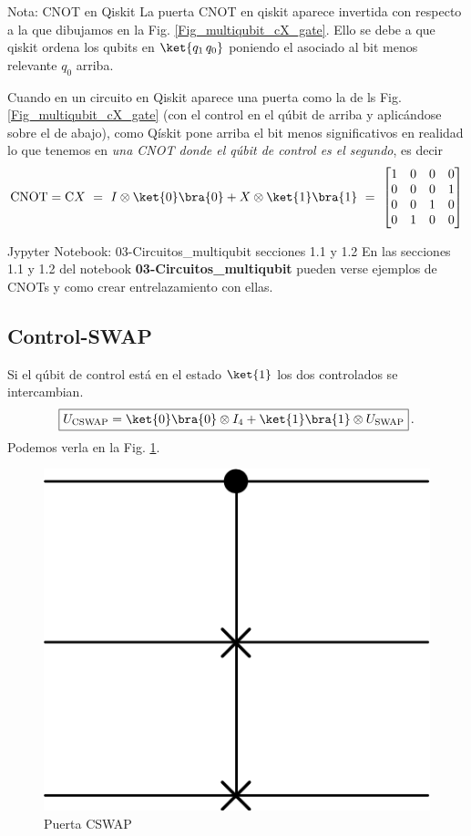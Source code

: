 \documentclass[a4paper,11pt]{book} %
\numberwithin{equation}{chapter}
\newcommand{\cg}[1]{{\rm C}#1}
\begin{document}
	\begin{mybox_blue}{Nota: CNOT en Qiskit}
	La puerta CNOT en qiskit aparece invertida con respecto a la que dibujamos en la Fig. \ref{Fig_multiqubit_cX_gate}. Ello se debe a que qiskit ordena 
	los qubits en $\ket{q_1 \, q_0}$ poniendo el asociado al bit menos relevante $q_0$ arriba. 
	
	\vspace{0.3cm}
	Cuando en un circuito en Qiskit aparece una puerta como la de ls Fig. \ref{Fig_multiqubit_cX_gate} (con el control en el qúbit de arriba y aplicándose sobre el de abajo), como Qískit pone arriba el 
	bit menos significativos en realidad lo que tenemos en \textit{una CNOT donde el qúbit de control es el segundo}, es decir
		\begin{equation}
		\hbox{CNOT} = \cg{X} ~=~ I \otimes \ket{0}\bra{0} + X \otimes \ket{1}\bra{1} 
		~=~ \begin{bmatrix} 1 & 0 & 0 & 0 \\ 0 & 0 & 0 & 1 \\ 0 & 0 & 1 & 0 \\ 0 & 1 & 0 & 0\end{bmatrix}
		\end{equation}
	\end{mybox_blue}
	
	\begin{mybox_orange}{Jypyter Notebook: 03-Circuitos\_multiqubit secciones 1.1 y 1.2}
	En las secciones 1.1 y 1.2 del notebook \textbf{03-Circuitos\_multiqubit} pueden verse ejemplos de CNOTs y como crear entrelazamiento con ellas.
	\end{mybox_orange}
    

        \subsection{Control-SWAP}

Si el qúbit  de control está en  el estado $\ket{1}$ los dos controlados se intercambian. 
	\begin{equation} \label{Fig_multiqubit_CSWAP_gate}
	\boxed{U_{\rm CSWAP} =\ket{0}\bra{0} \otimes I_4 + \ket{1}\bra{1} \otimes U_{\rm SWAP}} \, .
	\end{equation}
Podemos verla en la Fig. \ref{Fig_multiqubit_CSWAP_gate}. 
	\begin{figure}[H]
	\centering 
	\includegraphics[width=0.13\linewidth]{Figuras/Fig_multiqubit_CSWAP_gate}
	\caption{Puerta CSWAP}
	\label{Fig_multiqubit_CSWAP_gate}
	\end{figure}
\end{document}
